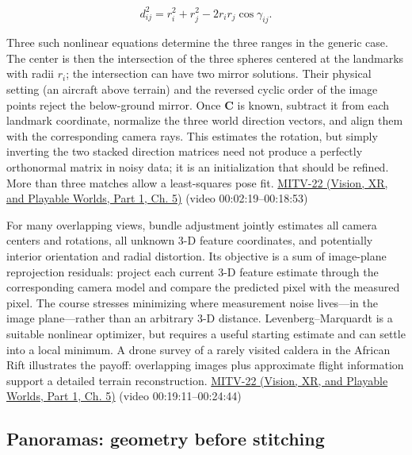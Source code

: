 \[
d_{ij}^2=r_i^2+r_j^2-2r_ir_j\cos\gamma_{ij}.
\]

Three such nonlinear equations determine the three ranges in the generic case. The center is then the intersection of the three spheres centered at the landmarks with radii \(r_i\); the intersection can have two mirror solutions. Their physical setting (an aircraft above terrain) and the reversed cyclic order of the image points reject the below-ground mirror. Once \(\mathbf C\) is known, subtract it from each landmark coordinate, normalize the three world direction vectors, and align them with the corresponding camera rays. This estimates the rotation, but simply inverting the two stacked direction matrices need not produce a perfectly orthonormal matrix in noisy data; it is an initialization that should be refined. More than three matches allow a least-squares pose fit. \href{../07-Vision-XR-and-Playable-Worlds-P01/main.pdf\#nameddest=04-visual-computing-ii-ch036-mitv-22---exterior-orientation-recovering-position-orientation-bundle-adjustment-object-shape}{MITV-22 (Vision, XR, and Playable Worlds, Part 1, Ch. 5)} (video 00:02:19--00:18:53)

For many overlapping views, bundle adjustment jointly estimates all camera centers and rotations, all unknown 3-D feature coordinates, and potentially interior orientation and radial distortion. Its objective is a sum of image-plane reprojection residuals: project each current 3-D feature estimate through the corresponding camera model and compare the predicted pixel with the measured pixel. The course stresses minimizing where measurement noise lives---in the image plane---rather than an arbitrary 3-D distance. Levenberg--Marquardt is a suitable nonlinear optimizer, but requires a useful starting estimate and can settle into a local minimum. A drone survey of a rarely visited caldera in the African Rift illustrates the payoff: overlapping images plus approximate flight information support a detailed terrain reconstruction. \href{../07-Vision-XR-and-Playable-Worlds-P01/main.pdf\#nameddest=04-visual-computing-ii-ch036-mitv-22---exterior-orientation-recovering-position-orientation-bundle-adjustment-object-shape}{MITV-22 (Vision, XR, and Playable Worlds, Part 1, Ch. 5)} (video 00:19:11--00:24:44)

\subsection{Panoramas: geometry before stitching}\label{03-visual-computing-i-ch003-panoramas-geometry-before-stitching}

